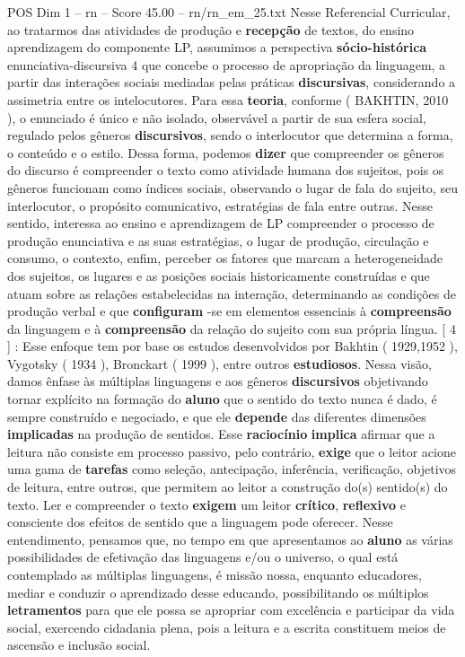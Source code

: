 \begin{textsample}{POS Dim 1 – rn – Score 45.00 – rn/rn\_em\_25.txt}
Nesse Referencial Curricular, ao tratarmos das atividades de produção e \textbf{recepção} de textos, do ensino aprendizagem do componente LP, assumimos a perspectiva \textbf{sócio-histórica} enunciativa-discursiva 4 que concebe o processo de apropriação da linguagem, a partir das interações sociais mediadas pelas práticas \textbf{discursivas}, considerando a assimetria entre os intelocutores.
Para essa \textbf{teoria}, conforme ( BAKHTIN, 2010 ), o enunciado é único e não isolado, observável a partir de sua esfera social, regulado pelos gêneros \textbf{discursivos}, sendo o interlocutor que determina a forma, o conteúdo e o estilo.
Dessa forma, podemos \textbf{dizer} que compreender os gêneros do discurso é compreender o texto como atividade humana dos sujeitos, pois os gêneros funcionam como índices sociais, observando o lugar de fala do sujeito, seu interlocutor, o propósito comunicativo, estratégias de fala entre outras.
Nesse sentido, interessa ao ensino e aprendizagem de LP compreender o processo de produção enunciativa e as suas estratégias, o lugar de produção, circulação e consumo, o contexto, enfim, perceber os fatores que marcam a heterogeneidade dos sujeitos, os lugares e as posições sociais historicamente construídas e que atuam sobre as relações estabelecidas na interação, determinando as condições de produção verbal e que \textbf{configuram} -se em elementos essenciais à \textbf{compreensão} da linguagem e à \textbf{compreensão} da relação do sujeito com sua própria língua. [ 4 ] : Esse enfoque tem por base os estudos desenvolvidos por Bakhtin ( 1929,1952 ), Vygotsky ( 1934 ), Bronckart ( 1999 ), entre outros \textbf{estudiosos}.
Nessa visão, damos ênfase às múltiplas linguagens e aos gêneros \textbf{discursivos} objetivando tornar explícito na formação do \textbf{aluno} que o sentido do texto nunca é dado, é sempre construído e negociado, e que ele \textbf{depende} das diferentes dimensões \textbf{implicadas} na produção de sentidos.
Esse \textbf{raciocínio} \textbf{implica} afirmar que a leitura não consiste em processo passivo, pelo contrário, \textbf{exige} que o leitor acione uma gama de \textbf{tarefas} como seleção, antecipação, inferência, verificação, objetivos de leitura, entre outros, que permitem ao leitor a construção do(s) sentido(s) do texto.
Ler e compreender o texto \textbf{exigem} um leitor \textbf{crítico}, \textbf{reflexivo} e consciente dos efeitos de sentido que a linguagem pode oferecer.
Nesse entendimento, pensamos que, no tempo em que apresentamos ao \textbf{aluno} as várias possibilidades de efetivação das linguagens e/ou o universo, o qual está contemplado as múltiplas linguagens, é missão nossa, enquanto educadores, mediar e conduzir o aprendizado desse educando, possibilitando os múltiplos \textbf{letramentos} para que ele possa se apropriar com excelência e participar da vida social, exercendo cidadania plena, pois a leitura e a escrita constituem meios de ascensão e inclusão social.

\end{textsample}
